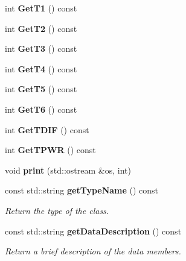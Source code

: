 \begin{DoxyCompactItemize}
\item 
int {\bfseries GetT1} () const \label{classCALICE_1_1EUDAQTempSensorBlock_a05f7d3cd2f61b94b7b355dad9ed04e71}

\item 
int {\bfseries GetT2} () const \label{classCALICE_1_1EUDAQTempSensorBlock_a57fceddca009de039005ae35728279bf}

\item 
int {\bfseries GetT3} () const \label{classCALICE_1_1EUDAQTempSensorBlock_abfa60426a963bcd31243be0e472451bd}

\item 
int {\bfseries GetT4} () const \label{classCALICE_1_1EUDAQTempSensorBlock_a02a094c6b095e4aa1a813ba6027b039b}

\item 
int {\bfseries GetT5} () const \label{classCALICE_1_1EUDAQTempSensorBlock_a7dcee9102c3faddf788cb26584bd991f}

\item 
int {\bfseries GetT6} () const \label{classCALICE_1_1EUDAQTempSensorBlock_a8dc023707cd85d0617ac89f9ccd04f91}

\item 
int {\bfseries GetTDIF} () const \label{classCALICE_1_1EUDAQTempSensorBlock_a84eecef47e27057ca1a52c2a771f65ec}

\item 
int {\bfseries GetTPWR} () const \label{classCALICE_1_1EUDAQTempSensorBlock_a5f8f3e5ed6e1dafbd2bd2e5a6c571ded}

\item 
void {\bfseries print} (std::ostream \&os, int)\label{classCALICE_1_1EUDAQTempSensorBlock_a573889f528e77c39321d3042d8715301}

\item 
const std::string {\bf getTypeName} () const \label{classCALICE_1_1EUDAQTempSensorBlock_aaf80776bd59b87c45ef15e10316142c4}

\begin{DoxyCompactList}\small\item\em Return the type of the class. \item\end{DoxyCompactList}\item 
const std::string {\bf getDataDescription} () const \label{classCALICE_1_1EUDAQTempSensorBlock_a63392b2373970e5d7d4854f5027a96ec}

\begin{DoxyCompactList}\small\item\em Return a brief description of the data members. \item\end{DoxyCompactList}\end{DoxyCompactItemize}



